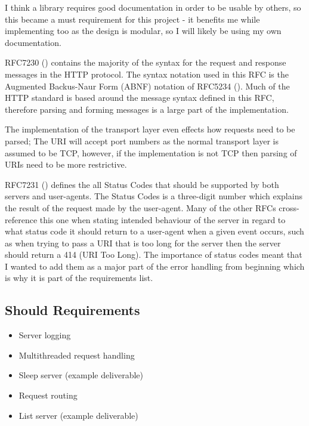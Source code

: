 \documentclass[12pt, a4paper]{article}
\begin{document}
I think a library requires good documentation in order to be usable by others, so this became a must
requirement for this project - it benefits me while implementing too as the design is modular, so I
will likely be using my own documentation.

RFC7230 (\cite{rfc7230}) contains the majority of the syntax for the request and response messages
in the HTTP protocol. The syntax notation used in this RFC is the Augmented Backus-Naur Form (ABNF)
notation of RFC5234 (\cite{rfc5234}). Much of the HTTP standard is based around the message syntax
defined in this RFC, therefore parsing and forming messages is a large part of the implementation.

The implementation of the transport layer even effects how requests need to be parsed; The URI
will accept port numbers as the normal transport layer is assumed to be TCP, however, if the
implementation is not TCP then parsing of URIs need to be more restrictive.

RFC7231 (\cite{rfc7231}) defines the all Status Codes that should be supported by both servers and
user-agents. The Status Codes is a three-digit number which explains the result of the request made
by the user-agent. Many of the other RFCs cross-reference this one when stating intended behaviour
of the server in regard to what status code it should return to a user-agent when a given event
occurs, such as when trying to pass a URI that is too long for the server then the server should
return a 414 (URI Too Long). The importance of status codes meant that I wanted to add them as a
major part of the error handling from beginning which is why it is part of the requirements list.

\subsection{Should Requirements}

\begin{itemize}
    \item\label{sreq:server-logging} Server logging
    \item\label{sreq:multithreaded-request-handling} Multithreaded request handling 
    \item\label{sreq:example-sleep-server} Sleep server (example deliverable)
    \item\label{sreq:request-routing} Request routing
    \item\label{mreq:example-list-server} List server (example deliverable)
\end{itemize}
\end{document}
